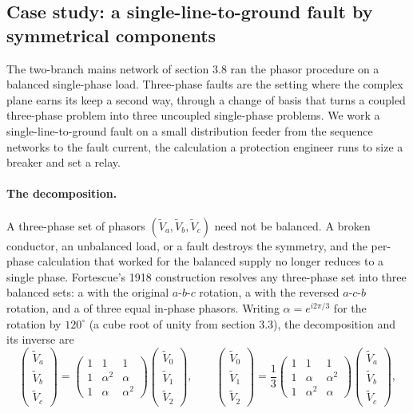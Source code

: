\subsection{Case study: a single-line-to-ground fault by symmetrical
components}

The two-branch mains network of section 3.8 ran the phasor procedure on
a balanced single-phase load. Three-phase faults are the setting where
the complex plane earns its keep a second way, through a change of basis
that turns a coupled three-phase problem into three uncoupled
single-phase problems. We work a single-line-to-ground fault on a small
distribution feeder from the sequence networks to the fault current, the
calculation a protection engineer runs to size a breaker and set a
relay.

\paragraph{The decomposition.} A three-phase set of phasors
$(\tilde V_{a}, \tilde V_{b}, \tilde V_{c})$ need not be balanced. A
broken conductor, an unbalanced load, or a fault destroys the symmetry,
and the per-phase calculation that worked for the balanced supply no
longer reduces to a single phase. Fortescue's 1918 construction resolves
any three-phase set into three balanced sets: a  with the original $a$-$b$-$c$ rotation, a  with the reversed $a$-$c$-$b$ rotation, and a  of three equal in-phase phasors. Writing $\alpha = e^{i 2\pi/3}$
for the rotation by $120^{\circ}$ (a cube root of unity from
section 3.3), the decomposition and its inverse are
\[
\begin{pmatrix} \tilde V_{a} \\ \tilde V_{b} \\ \tilde V_{c} \end{pmatrix}
= \begin{pmatrix} 1 & 1 & 1 \\ 1 & \alpha^{2} & \alpha \\ 1 & \alpha & \alpha^{2} \end{pmatrix}
\begin{pmatrix} \tilde V_{0} \\ \tilde V_{1} \\ \tilde V_{2} \end{pmatrix},
\qquad
\begin{pmatrix} \tilde V_{0} \\ \tilde V_{1} \\ \tilde V_{2} \end{pmatrix}
= \frac{1}{3}\begin{pmatrix} 1 & 1 & 1 \\ 1 & \alpha & \alpha^{2} \\ 1 & \alpha^{2} & \alpha \end{pmatrix}
\begin{pmatrix} \tilde V_{a} \\ \tilde V_{b} \\ \tilde V_{c} \end{pmatrix},
\]
